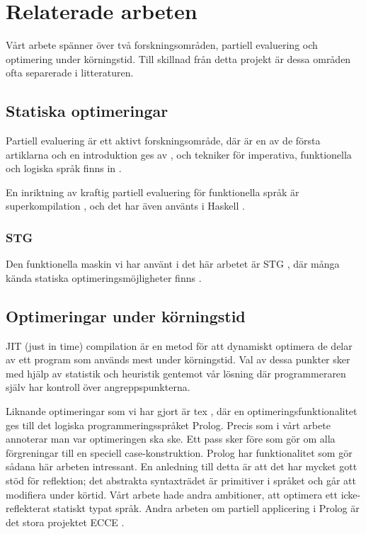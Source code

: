 \documentclass[Rapport]{subfiles}
\begin{document}
\section{Relaterade arbeten}

Vårt arbete spänner över två forskningsområden, partiell evaluering
och optimering under körningstid. Till skillnad från detta projekt 
är dessa områden ofta separerade i litteraturen.

\subsection{Statiska optimeringar}

Partiell evaluering är ett aktivt forskningsområde, där 
\cite{futamura} är en av de första artiklarna
och en introduktion ges av \cite{intropap}, och
tekniker för imperativa, funktionella och logiska språk
finns in \cite{jones1993partial}.

En inriktning av kraftig partiell evaluering för 
funktionella språk är superkompilation \cite{srensen1995algorithm}
, och det har även använts i Haskell \cite{mitchell2007supercompiler}.


\subsubsection{STG}

Den funktionella maskin vi har använt i det här arbetet är 
STG \cite{stg}, där många kända statiska optimeringsmöjligheter 
finns \cite{santos}.

\subsection{Optimeringar under körningstid}

JIT (just in time) compilation är en metod för att dynamiskt optimera
de delar av ett program som används mest under körningstid. Val av
dessa punkter sker med hjälp av statistik och heuristik gentemot vår
lösning där programmeraren själv har kontroll över angreppspunkterna. 


Liknande optimeringar som vi har gjort är tex \cite{bolz-automatic},
där en optimeringsfunktionalitet ges till det logiska programmeringsspråket
Prolog. Precis som i vårt arbete annoterar man var optimeringen ska ske.
Ett pass sker före som gör om alla förgreningar till en speciell 
case-konstruktion. Prolog har funktionalitet som gör sådana här arbeten
intressant. En anledning till detta är att det har mycket gott stöd för
reflektion;  det abstrakta syntaxträdet är primitiver i språket och 
går att modifiera under körtid. 
Vårt arbete hade andra ambitioner, att optimera ett icke-reflekterat 
statiskt typat språk. Andra arbeten om partiell applicering i 
Prolog är det stora projektet ECCE \cite{ecce}.
\end{document}

